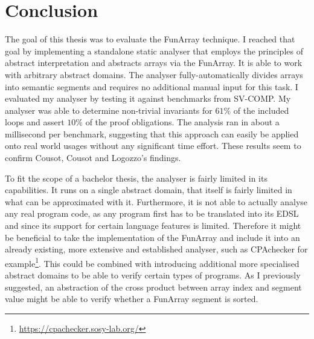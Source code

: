 \chapter{Conclusion}\label{chap:conclusion}

The goal of this thesis was to evaluate the FunArray technique. I reached that goal by implementing a standalone static analyser that employs the principles of abstract interpretation and abstracts arrays via the FunArray. It is able to work with arbitrary abstract domains. The analyser fully-automatically divides arrays into semantic segments and requires no additional manual input for this task.
I evaluated my analyser by testing it against benchmarks from SV-COMP. My analyser was able to determine non-trivial invariants for $61\%$ of the included loops and assert $10\%$ of the proof obligations. The analysis ran in about a millisecond per benchmark, suggesting that this approach can easily be applied onto real world usages without any significant time effort. These results seem to confirm Cousot, Cousot and Logozzo's findings.

To fit the scope of a bachelor thesis, the analyser is fairly limited in its capabilities. It runs on a single abstract domain, that itself is fairly limited in what can be approximated with it. Furthermore, it is not able to actually analyse any real program code, as any program first has to be translated into its EDSL and since its support for certain language features is limited. Therefore it might be beneficial to take the implementation of the FunArray and include it into an already existing, more extensive and established analyser, such as CPAchecker for example\footnote{\url{https://cpachecker.sosy-lab.org/}}.
This could be combined with introducing additional more specialised abstract domains to be able to verify certain types of programs. As I previously suggested, an abstraction of the cross product between array index and segment value might be able to verify whether a FunArray segment is sorted.

